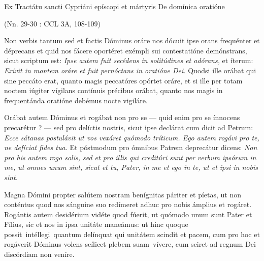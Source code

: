 \documentclass[options]{article}
\begin{document}
	Ex Tractátu sancti Cypriáni epíscopi et mártyris De domínica oratióne \begin{flushright}
		(Nn. 29-30 : CCL 3A, 108-109)
	\end{flushright}
Non verbis tantum sed et factis Dóminus oráre nos dócuit ipse orans frequénter et déprecans et quid nos fácere oportéret exémpli sui contestatióne demónstrans, sicut scriptum est: 
\emph{Ipse autem fuit secédens in solitúdines et adórans,}
 et íterum: 
 \emph{ Exívit in montem oráre et fuit pernóctans in oratióne Dei.}
Quodsi ille orábat qui sine peccáto erat, quanto magis peccatóres opórtet oráre, et si ille per totam noctem iúgiter vígilans contínuis précibus orábat, quanto nos magis in frequentánda oratióne debémus nocte vigiláre.


Orábat autem Dóminus et rogábat non pro se — quid enim pro se ínnocens precarétur ? — sed pro delíctis nostris, sicut ipse declárat cum dicit ad Petrum: 
\emph{Ecce sátanas postulávit ut vos vexáret quómodo tríticum. Ego autem rogávi pro te, ne defíciat fides tua.}
 Et póstmodum pro ómnibus Patrem deprecátur dicens: 
 \emph{Non pro his autem rogo solis, sed et pro illis qui creditúri sunt per verbum ipsórum in me, ut omnes unum sint, sicut et tu, Pater, in me et ego in te, ut et ipsi in nobis sint.}

Magna Dómini propter salútem nostram benígnitas páriter et píetas, ut non conténtus quod nos sánguine suo redímeret adhuc pro nobis ámplius et rogáret. Rogántis autem desidérium vidéte quod fúerit, ut quómodo unum sunt Pater et Fílius, sic et nos in ipsa unitáte maneámus: ut hinc quoque possit intéllegi quantum delínquat qui unitátem scindit et pacem, cum pro hoc et rogáverit Dóminus volens scílicet plebem suam vívere, cum sciret ad regnum Dei discórdiam non veníre.
	
	
\end{document}
